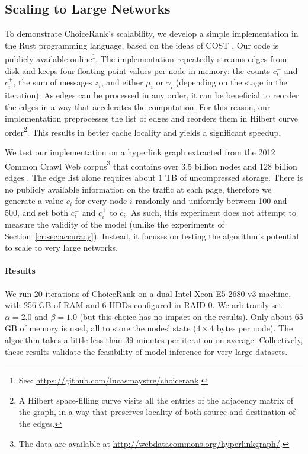 \subsection{Scaling to Large Networks}

To demonstrate ChoiceRank's scalability, we develop a simple implementation in the Rust programming language, based on the ideas of COST \citep{mcsherry2015scalability}.
Our code is publicly available online\footnote{See: \url{https://github.com/lucasmaystre/choicerank}.}.
The implementation repeatedly streams edges from disk and keeps four floating-point values per node in memory:
the counts $c^-_i$ and $c^+_i$, the sum of messages $z_i$, and either $\mu_i$ or $\gamma_i$ (depending on the stage in the iteration).
As edges can be processed in any order, it can be beneficial to reorder the edges in a way that accelerates the computation.
For this reason, our implementation preprocesses the list of edges and reorders them in Hilbert curve order\footnote{A Hilbert space-filling curve visits all the entries of the adjacency matrix of the graph, in a way that preserves locality of both source and destination of the edges.}.
This results in better cache locality and yields a significant speedup.

We test our implementation on a hyperlink graph extracted from the 2012 Common Crawl Web corpus\footnote{
The data are available at \url{http://webdatacommons.org/hyperlinkgraph/}.} that contains over \num{3.5} billion nodes and \num{128} billion edges \citep{meusel2014graph}.
The edge list alone requires about $1$ TB of uncompressed storage.
There is no publicly available information on the traffic at each page, therefore we generate a value $c_i$ for every node $i$ randomly and uniformly between \num{100} and \num{500}, and set both $c^-_i$ and $c^+_i$ to $c_i$.
As such, this experiment does not attempt to measure the validity of the model (unlike the experiments of Section~\ref{cr:sec:accuracy}).
Instead, it focuses on testing the algorithm's potential to scale to very large networks.

\paragraph{Results}
We run \num{20} iterations of ChoiceRank on a dual Intel Xeon E5-2680 v3 machine, with \num{256} GB of RAM and \num{6} HDDs configured in RAID 0.
We arbitrarily set $\alpha = 2.0$ and $\beta = 1.0$ (but this choice has no impact on the results).
Only about \num{65} GB of memory is used, all to store the nodes' state ($4 \times 4$ bytes per node).
The algorithm takes a little less than \num{39} minutes per iteration on average.
Collectively, these results validate the feasibility of model inference for very large datasets.

